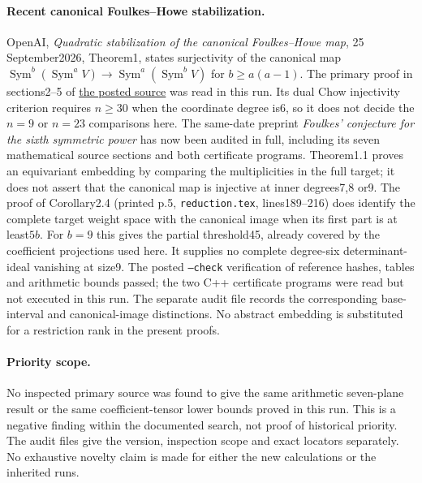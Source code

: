 \paragraph{Recent canonical Foulkes--Howe stabilization.}
OpenAI, \emph{Quadratic stabilization of the canonical Foulkes--Howe
map}, 25 September2026, Theorem1, states surjectivity of the canonical
map $\operatorname{Sym}^b(\operatorname{Sym}^a V)\to
\operatorname{Sym}^a(\operatorname{Sym}^b V)$ for $b\ge a(a-1)$.
The primary proof in sections2--5 of
\href{https://github.com/openai/math/blob/main/preprints/Quadratic-Stabilization-of-the-Canonical-Foulkes-Howe-Map-September-25-2026/build/paper.tex}{the posted source}
was read in this run. Its dual Chow injectivity criterion requires
$n\ge30$ when the coordinate degree is6, so it does not decide
the $n=9$ or $n=23$ comparisons here. The same-date preprint
\emph{Foulkes' conjecture for the sixth symmetric power} has now been
audited in full, including its seven mathematical source sections and
both certificate programs. Theorem1.1 proves an equivariant embedding
by comparing the multiplicities in the full target; it does not assert
that the canonical map is injective at inner degrees7,8 or9. The proof
of Corollary2.4 (printed p.5, \texttt{reduction.tex}, lines189--216)
does identify the complete target weight space with the canonical
image when its first part is at least$5b$. For $b=9$ this gives the
partial threshold45, already covered by the coefficient projections
used here. It supplies no complete degree-six determinant-ideal
vanishing at size9. The posted \texttt{--check} verification of reference
hashes, tables and arithmetic bounds passed; the two C++ certificate
programs were read but not executed in this run. The separate audit
file records the corresponding base-interval and canonical-image
distinctions. No abstract embedding is substituted for a restriction
rank in the present proofs.

\paragraph{Priority scope.}
No inspected primary source was found to give the same arithmetic
seven-plane result or the same coefficient-tensor lower bounds proved
in this run. This is a negative finding within the documented search,
not proof of historical priority. The audit files give the version,
inspection scope and exact locators separately. No exhaustive novelty
claim is made for either the new calculations or the inherited runs.
